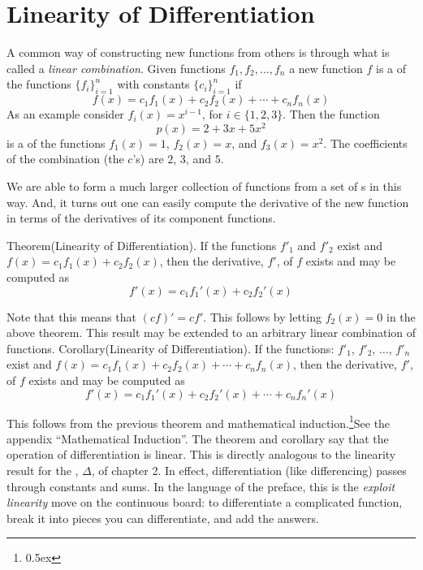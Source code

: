
\section{Linearity of Differentiation}
A common way of constructing new functions from others is through what is 
called a {\it linear combination\/}. 
Given functions $f_1, f_2, \ldots, f_n$ a new 
function $f$ is a  of the functions $\{f_i\}_{i=1}^n$ 
with constants $\{c_i\}_{i=1}^n$ if 
$$
f(x) = c_1 f_1(x) + c_2 f_2(x) + \cdots + c_n f_n(x)
$$
As an example consider $f_i(x) = x^{i-1}$, for $i \in \{1,2,3\}$.
Then the function
$$
p(x) = 2 + 3x + 5x^2
$$
is a  of the functions $f_1(x) = 1$, $f_2(x) = x$, and
$f_3(x) = x^2$. The coefficients of the combination (the $c$'s)
are $2$, $3$, and $5$.

We are able to form a much larger collection of functions from 
a set of s in 
this way. And, it turns out one can easily compute 
the derivative of the new function 
in terms of the derivatives of its component functions.

\proclaim Theorem(Linearity of Differentiation). If the functions $f'_1$ and $f'_2$ exist and 
$f(x) = c_1 f_1(x) + c_2 f_2(x) $, then the derivative, 
$f'$, of $f$ exists and may be computed  as
$$
f'(x) = c_1 f_1'(x) + c_2 f_2'(x) 
$$

Note that this means that $(c f)' = c f'$. This follows by letting $f_2(x) = 0$ in the above theorem.
This result may be extended to an arbitrary linear combination of functions.
\proclaim Corollary(Linearity of Differentiation). If the functions: $f'_1$, $f'_2$, $\ldots$, $f'_n$ exist and 
$f(x) = c_1 f_1(x) + c_2 f_2(x) + \cdots + c_n f_n(x)$, then the derivative, 
$f'$, of $f$ exists and may be computed  as
$$
f'(x) = c_1 f_1'(x) + c_2 f_2'(x) + \cdots + c_n f_n'(x)
$$

This follows from the previous theorem and mathematical induction.\footnote{\kern 0.5pt \raise 0.5ex \hbox{\dag}}{See the appendix ``Mathematical Induction''.}
The theorem and corollary say that the operation of differentiation is linear. This is directly analogous to the linearity
result for the , $\Delta$, of chapter 2. In effect, differentiation (like differencing)
passes through constants and sums. In the language of the preface, this is
the {\it exploit linearity\/} move on the continuous board: to differentiate
a complicated function, break it into pieces you can differentiate, and add
the answers.

